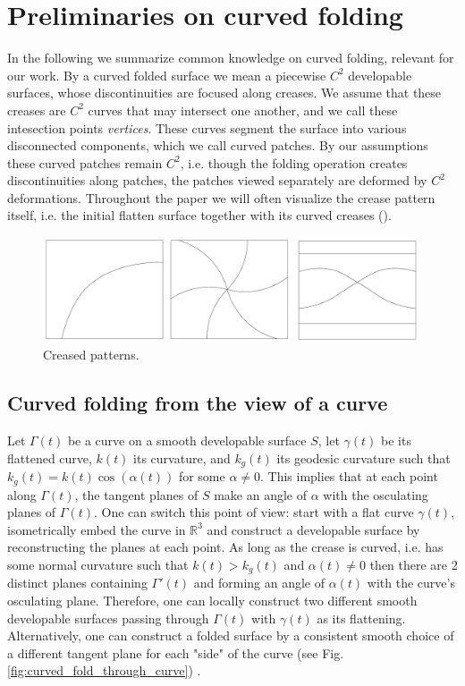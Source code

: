 \section{Preliminaries on curved folding} \label{sec:pre}
In the following we summarize common knowledge on curved folding, relevant for our work. By a curved folded surface we mean a piecewise $C^2$ developable surfaces, whose discontinuities are focused along creases. We assume that these creases are $C^2$ curves that may intersect one another, and we call these intesection points \textit{vertices}. These curves segment the surface into various disconnected components, which we call curved patches. By our assumptions these curved patches remain $C^2$, i.e. though the folding operation creates discontinuities along patches, the patches viewed separately are deformed by $C^2$ deformations. Throughout the paper we will often visualize the crease pattern itself, i.e. the initial flatten surface together with its curved creases ().

\begin{figure} [h]
	\centering
	\includegraphics[width=\linewidth]{figures/crease_patterns}
	\caption{Creased patterns.}
	\label{fig:crease_pattern}
\end{figure}

\subsection{Curved folding from the view of a curve} \label{sec:curved_folding_from_a_curve}
Let $\Gamma(t)$ be a curve on a smooth developable surface $S$,  let $\gamma(t)$ be its flattened curve, $k(t)$ its curvature, and $k_g(t)$ its geodesic curvature such that $k_g(t) = k(t) \cos(\alpha(t))$ for some $\alpha \neq 0$. This implies that at each point along $\Gamma(t)$, the tangent planes of $S$ make an angle of $\alpha$ with the osculating planes of $\Gamma(t)$. One can switch this point of view: start with a flat curve $\gamma(t)$, isometrically embed the curve in $\mathbb{R}^3$ and construct a developable surface by reconstructing the planes at each point. As long as the crease is curved, i.e. has some normal curvature such that $k(t) > k_g(t)$ and $\alpha(t) \neq 0$ then there are 2 distinct planes containing $\Gamma'(t)$ and forming an angle of $\alpha(t)$ with the curve's osculating plane. Therefore, one can locally construct two different smooth developable surfaces passing through $\Gamma(t)$ with $\gamma(t)$ as its flattening. Alternatively, one can construct a folded surface by a consistent smooth choice of a different tangent plane for each "side" of the curve (see Fig. \ref{fig:curved_fold_through_curve}) \cite{more_on_paper}.

